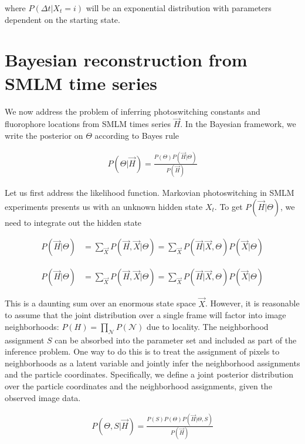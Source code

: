 \documentclass{ucetd}
\begin{document}
where $P(\Delta t | X_{t} = i) $ will be an exponential distribution with parameters dependent on the starting state. 

\section{Bayesian reconstruction from SMLM time series}


We now address the problem of inferring photoswitching constants and fluorophore locations from SMLM times series $\vec{H}$. In the Bayesian framework, we write the posterior on $\Theta$ according to Bayes rule

\begin{align*}
P(\Theta|\vec{H}) = \frac{P(\Theta)P(\vec{H}|\Theta)}{P(\vec{H})}
\end{align*}

Let us first address the likelihood function. Markovian photoswitching in SMLM experiments presents us with an unknown hidden state $X_{t}$. To get $P(\vec{H}|\Theta)$, we need to integrate out the hidden state

\begin{align*}
P(\vec{H}|\Theta) &= \sum_{\vec{X}} P(\vec{H},\vec{X}|\Theta) = \sum_{\vec{X}} P(\vec{H}|\vec{X},\Theta)P(\vec{X}|\Theta)
\end{align*}

\begin{align*}
P(\vec{H}|\Theta) &= \sum_{\vec{X}} P(\vec{H},\vec{X}|\Theta) = \sum_{\vec{X}} P(\vec{H}|\vec{X},\Theta)P(\vec{X}|\Theta)
\end{align*}

This is a daunting sum over an enormous state space $\vec{X}$. However, it is reasonable to assume that the joint distribution over a single frame will factor into image neighborhoods: $P(H) = \prod_{\mathcal{N}}P(\mathcal{N})$ due to locality. The neighborhood assignment $S$ can be absorbed into the parameter set and included as part of the inference problem. One way to do this is to treat the assignment of pixels to neighborhoods as a latent variable and jointly infer the neighborhood assignments and the particle coordinates. Specifically, we define a joint posterior distribution over the particle coordinates and the neighborhood assignments, given the observed image data. 

\begin{align*}
P(\Theta,S|\vec{H}) = \frac{P(S)P(\Theta)P(\vec{H}|\Theta,S)}{P(\vec{H})}
\end{align*}
\end{document}
